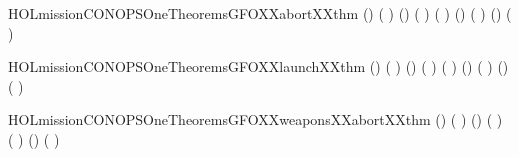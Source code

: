 \newcommand{\HOLmissionCONOPSOneTheoremsBFOXXweaponsXXabortXXthm}{\UseVerbatim{HOLmissionCONOPSOneTheoremsBFOXXweaponsXXabortXXthm}}
\begin{SaveVerbatim}{HOLmissionCONOPSOneTheoremsGFOXXabortXXthm}
\HOLTokenTurnstile{} (\HOLSymConst{,}\HOLSymConst{,})      ( ) \HOLSymConst{\HOLTokenImp{}}
   (\HOLSymConst{,}\HOLSymConst{,})   ( )   ( ) \HOLSymConst{\HOLTokenImp{}}
   (\HOLSymConst{,}\HOLSymConst{,})      ( ) \HOLSymConst{\HOLTokenImp{}}
   (\HOLSymConst{,}\HOLSymConst{,})      ( )
\end{SaveVerbatim}
\newcommand{\HOLmissionCONOPSOneTheoremsGFOXXabortXXthm}{\UseVerbatim{HOLmissionCONOPSOneTheoremsGFOXXabortXXthm}}
\begin{SaveVerbatim}{HOLmissionCONOPSOneTheoremsGFOXXlaunchXXthm}
\HOLTokenTurnstile{} (\HOLSymConst{,}\HOLSymConst{,})      ( ) \HOLSymConst{\HOLTokenImp{}}
   (\HOLSymConst{,}\HOLSymConst{,})   ( )   ( ) \HOLSymConst{\HOLTokenImp{}}
   (\HOLSymConst{,}\HOLSymConst{,})      ( ) \HOLSymConst{\HOLTokenImp{}}
   (\HOLSymConst{,}\HOLSymConst{,})      ( )
\end{SaveVerbatim}
\newcommand{\HOLmissionCONOPSOneTheoremsGFOXXlaunchXXthm}{\UseVerbatim{HOLmissionCONOPSOneTheoremsGFOXXlaunchXXthm}}
\begin{SaveVerbatim}{HOLmissionCONOPSOneTheoremsGFOXXweaponsXXabortXXthm}
\HOLTokenTurnstile{} (\HOLSymConst{,}\HOLSymConst{,})      ( ) \HOLSymConst{\HOLTokenImp{}}
   (\HOLSymConst{,}\HOLSymConst{,}) 
       ( ) 
       ( ) \HOLSymConst{\HOLTokenImp{}}
   (\HOLSymConst{,}\HOLSymConst{,})   ( )
\end{SaveVerbatim}

